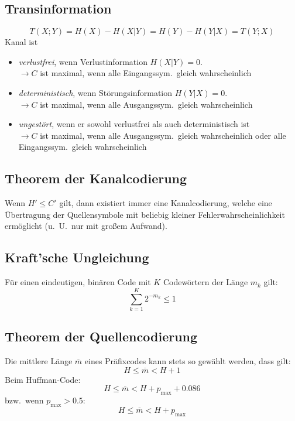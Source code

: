 \subsection*{Transinformation}
\[
    T(X; Y) = H(X) - H(X | Y) = H(Y) - H(Y | X) = T(Y; X)
\]
Kanal ist 
\begin{itemize}
    \setlength{\parskip}{0pt}
    \setlength{\itemsep}{0pt plus 1pt}
    \item \textit{verlustfrei}, wenn Verlustinformation $ H(X | Y) = 0. $ \\
        $ \rightarrow C $ ist maximal, wenn alle Eingangssym.\ gleich
        wahrscheinlich
    \item \textit{deterministisch}, wenn Störungsinformation $ H(Y | X) = 0. $ \\
        $ \rightarrow C $ ist maximal, wenn alle Ausgangssym.\ gleich
        wahrscheinlich
    \item \textit{ungestört}, wenn er sowohl verlustfrei als auch
        deterministisch ist \\
        $ \rightarrow C $ ist maximal, wenn alle Ausgangssym.\ gleich
        wahrscheinlich oder alle Eingangssym.\ gleich wahrscheinlich
\end{itemize}

\subsection*{Theorem der Kanalcodierung}
Wenn $ H' \leq C' $ gilt, dann existiert immer eine Kanalcodierung, welche eine
Übertragung der Quellensymbole mit beliebig kleiner Fehlerwahrscheinlichkeit
ermöglicht (u.\ U.\ nur mit großem Aufwand).

\subsection*{Kraft'sche Ungleichung}
Für einen eindeutigen, binären Code mit $ K $ Codewörtern der Länge $ m_k $ gilt:
\[
    \sum_{k=1}^{K} 2^{-m_k} \le 1
\]

\subsection*{Theorem der Quellencodierung}
Die mittlere Länge $ \overline{m} $ eines Präfixcodes kann stets so gewählt
werden, dass gilt:
\[
    H \leq \overline{m} < H + 1
\]
Beim Huffman-Code:
\[
    H \leq \overline{m} < H + p_{\max} + 0.086
\]
bzw.\ wenn $ p_{\max} > 0.5 $:
\[
    H \leq \overline{m} < H + p_{\max}
\]

